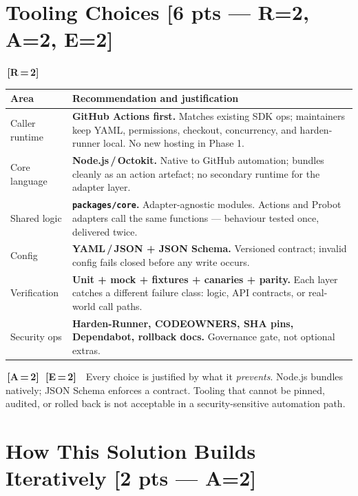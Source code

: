\documentclass[9pt, a4paper]{article}
\newcommand{\ic}[2]{%
  {\colorbox{tag#1}{\color{white}\bfseries\fontsize{5.5}{6.5}\selectfont\,[#1\,=\,#2]\,}}%
}
\DeclareRobustCommand{\mb}[1]{%
  \texorpdfstring{\hfill{\fontsize{6.5}{7}\selectfont\color{hieroGray}[#1]}}{}%
}
\newcommand{\tsize}{\fontsize{7.8}{9.5}\selectfont}
\begin{document}
\begin{multicols}{2}
\section{Tooling Choices \mb{6 pts — R=2, A=2, E=2}}

\ic{R}{2}

\vspace{1pt}
{\tsize
\begin{tabularx}{\linewidth}{@{}L{1.65cm}X@{}}
\toprule
\textbf{Area} & \textbf{Recommendation and justification} \\
\midrule
Caller runtime &
  \textbf{GitHub Actions first.} Matches existing SDK ops; maintainers keep YAML, permissions,
  checkout, concurrency, and harden-runner local. No new hosting in Phase 1. \\
Core language &
  \textbf{Node.js\,/\,Octokit.} Native to GitHub automation; bundles cleanly as an action
  artefact; no secondary runtime for the adapter layer. \\
Shared logic &
  \textbf{\texttt{packages/core}.} Adapter-agnostic modules. Actions and Probot adapters call
  the same functions — behaviour tested once, delivered twice. \\
Config &
  \textbf{YAML\,/\,JSON + JSON Schema.} Versioned contract; invalid config fails closed before
  any write occurs. \\
Verification &
  \textbf{Unit + mock + fixtures + canaries + parity.} Each layer catches a different failure
  class: logic, API contracts, or real-world call paths. \\
Security ops &
  \textbf{Harden-Runner, CODEOWNERS, SHA pins, Dependabot, rollback docs.}
  Governance gate, not optional extras. \\
\bottomrule
\end{tabularx}}

\begin{invariantbox}
\fontsize{7.5}{9}\selectfont
\ic{A}{2}\ic{E}{2}\ Every choice is justified by what it \emph{prevents}. Node.js bundles
natively; JSON Schema enforces a contract. Tooling that cannot be pinned, audited, or
rolled back is not acceptable in a security-sensitive automation path.
\end{invariantbox}

\section{How This Solution Builds Iteratively \mb{2 pts — A=2}}


\end{multicols}
\end{document}
